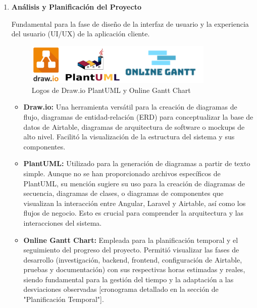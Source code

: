 \begin{enumerate}

    \item \textbf{Análisis y Planificación del Proyecto}

    Fundamental para la fase de diseño de la interfaz de usuario y la experiencia del usuario (UI/UX) de la aplicación cliente.

    \begin{figure}[H]
        \begin{center}
            \includegraphics[width = 0.85\textwidth]{Figuras/logosdrawioplantumlonlineganttchart.png}
        \end{center}
        \caption{\label{fig:logosdrawioplantumlonlineganttchart} Logos de Draw.io PlantUML y Online Gantt Chart}
    \end{figure}

    \begin{itemize}
        \item \textbf{Draw.io:} Una herramienta versátil para la creación de diagramas de flujo, diagramas de entidad-relación (ERD) para conceptualizar la base de datos de Airtable, diagramas de arquitectura de software o mockups de alto nivel. Facilitó la visualización de la estructura del sistema y sus componentes.

        \item \textbf{PlantUML:} Utilizado para la generación de diagramas a partir de texto simple. Aunque no se han proporcionado archivos específicos de PlantUML, su mención sugiere su uso para la creación de diagramas de secuencia, diagramas de clases, o diagramas de componentes que visualizan la interacción entre Angular, Laravel y Airtable, así como los flujos de negocio. Esto es crucial para comprender la arquitectura y las interacciones del sistema.
        
        \item \textbf{Online Gantt Chart:} Empleada para la planificación temporal y el seguimiento del progreso del proyecto. Permitió visualizar las fases de desarrollo (investigación, backend, frontend, configuración de Airtable, pruebas y documentación) con sus respectivas horas estimadas y reales, siendo fundamental para la gestión del tiempo y la adaptación a las desviaciones observadas [cronograma detallado en la sección de "Planificación Temporal"].
    \end{itemize}


\end{enumerate}
